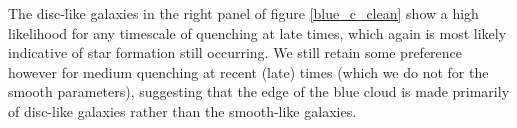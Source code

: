 \documentclass{mn2e}
\begin{document}
The disc-like galaxies in the right panel of figure \ref{blue_c_clean} show a high likelihood for any timescale of quenching at late times, which again is most likely indicative of star formation still occurring. We still retain some preference however for medium quenching at recent (late) times (which we do not for the smooth parameters), suggesting that the edge of the blue cloud is made primarily of disc-like galaxies rather than the smooth-like galaxies. 

%
\end{document}
